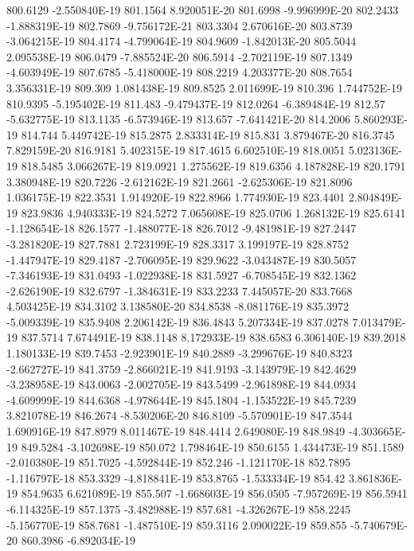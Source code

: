 800.6129  -2.550840E-19
801.1564  8.920051E-20
801.6998  -9.996999E-20
802.2433  -1.888319E-19
802.7869  -9.756172E-21
803.3304  2.670616E-20
803.8739  -3.064215E-19
804.4174  -4.799064E-19
804.9609  -1.842013E-20
805.5044  2.095538E-19
806.0479  -7.885524E-20
806.5914  -2.702119E-19
807.1349  -4.603949E-19
807.6785  -5.418000E-19
808.2219  4.203377E-20
808.7654  3.356331E-19
809.309  1.081438E-19
809.8525  2.011699E-19
810.396  1.744752E-19
810.9395  -5.195402E-19
811.483  -9.479437E-19
812.0264  -6.389484E-19
812.57  -5.632775E-19
813.1135  -6.573946E-19
813.657  -7.641421E-20
814.2006  5.860293E-19
814.744  5.449742E-19
815.2875  2.833314E-19
815.831  3.879467E-20
816.3745  7.829159E-20
816.9181  5.402315E-19
817.4615  6.602510E-19
818.0051  5.023136E-19
818.5485  3.066267E-19
819.0921  1.275562E-19
819.6356  4.187828E-19
820.1791  3.380948E-19
820.7226  -2.612162E-19
821.2661  -2.625306E-19
821.8096  1.036175E-19
822.3531  1.914920E-19
822.8966  1.774930E-19
823.4401  2.804849E-19
823.9836  4.940333E-19
824.5272  7.065608E-19
825.0706  1.268132E-19
825.6141  -1.128654E-18
826.1577  -1.488077E-18
826.7012  -9.481981E-19
827.2447  -3.281820E-19
827.7881  2.723199E-19
828.3317  3.199197E-19
828.8752  -1.447947E-19
829.4187  -2.706095E-19
829.9622  -3.043487E-19
830.5057  -7.346193E-19
831.0493  -1.022938E-18
831.5927  -6.708545E-19
832.1362  -2.626190E-19
832.6797  -1.384631E-19
833.2233  7.445057E-20
833.7668  4.503425E-19
834.3102  3.138580E-20
834.8538  -8.081176E-19
835.3972  -5.009339E-19
835.9408  2.206142E-19
836.4843  5.207334E-19
837.0278  7.013479E-19
837.5714  7.674491E-19
838.1148  8.172933E-19
838.6583  6.306140E-19
839.2018  1.180133E-19
839.7453  -2.923901E-19
840.2889  -3.299676E-19
840.8323  -2.662727E-19
841.3759  -2.866021E-19
841.9193  -3.143979E-19
842.4629  -3.238958E-19
843.0063  -2.002705E-19
843.5499  -2.961898E-19
844.0934  -4.609999E-19
844.6368  -4.978644E-19
845.1804  -1.153522E-19
845.7239  3.821078E-19
846.2674  -8.530206E-20
846.8109  -5.570901E-19
847.3544  1.690916E-19
847.8979  8.011467E-19
848.4414  2.649080E-19
848.9849  -4.303665E-19
849.5284  -3.102698E-19
850.072  1.798464E-19
850.6155  1.434473E-19
851.1589  -2.010380E-19
851.7025  -4.592844E-19
852.246  -1.121170E-18
852.7895  -1.116797E-18
853.3329  -4.818841E-19
853.8765  -1.533334E-19
854.42  3.861836E-19
854.9635  6.621089E-19
855.507  -1.668603E-19
856.0505  -7.957269E-19
856.5941  -6.114325E-19
857.1375  -3.482988E-19
857.681  -4.326267E-19
858.2245  -5.156770E-19
858.7681  -1.487510E-19
859.3116  2.090022E-19
859.855  -5.740679E-20
860.3986  -6.892034E-19
